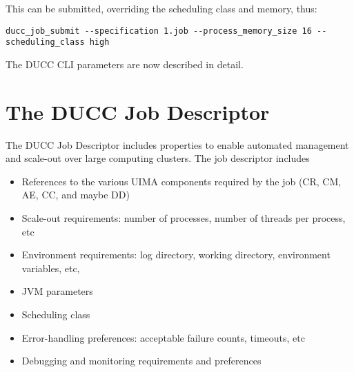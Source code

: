     This can be submitted, overriding the scheduling class and memory, thus:
\begin{verbatim}
ducc_job_submit --specification 1.job --process_memory_size 16 --scheduling_class high
\end{verbatim}    

    The DUCC CLI parameters are now described in detail.

    \section{The DUCC Job Descriptor}
    The DUCC Job Descriptor includes properties to enable automated management and scale-out 
    over large computing clusters.  The job descriptor includes
    \begin{itemize}
      \item References to the various UIMA components required by the job (CR, CM, AE, CC, and maybe DD)
      \item Scale-out requirements: number of processes, number of threads per process, etc
      \item Environment requirements: log directory, working directory, environment variables, etc,
      \item JVM parameters
      \item Scheduling class
      \item Error-handling preferences: acceptable failure counts, timeouts, etc
      \item Debugging and monitoring requirements and preferences
    \end{itemize}
  
